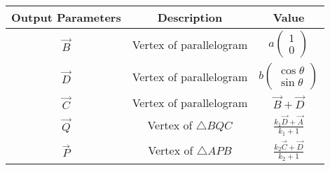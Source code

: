 \begin{tabular}{|c|c|c|}
\hline
    \textbf{Output Parameters} &\textbf{Description} &\textbf{Value} \\
    \hline
     $\vec{B}$ &Vertex of parallelogram&$a\begin{pmatrix}
     1\\0
     \end{pmatrix}$\\
      \hline
     $\vec{D}$ &Vertex of parallelogram &$b\begin{pmatrix} \cos{\theta}\\\sin{\theta}
     \end{pmatrix}$\\
     \hline
     $\vec{C}$&Vertex of parallelogram&$\vec{B}+\vec{D}$\\
     \hline
      $\vec{ Q}$ &Vertex of $\triangle BQC$&$\frac{k_1\vec{D}+\vec{A}}{k_1+1}$\\
     \hline
      $\vec{P}$ &Vertex of $\triangle APB$&$\frac{k_2\vec{C}+\vec{D}}{k_2+1}$\\
   \hline
\end{tabular}
